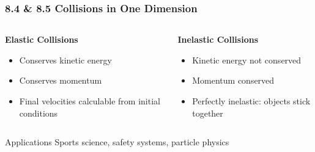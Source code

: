 \documentclass[aspectratio=169]{beamer}
\begin{document}
\begin{frame}
\frametitle{8.4 & 8.5 Collisions in One Dimension}
\begin{columns}[t]
\begin{column}{0.48\textwidth}
\textbf{Elastic Collisions}
\begin{itemize}
\item Conserves kinetic energy
\item Conserves momentum
\item Final velocities calculable from initial conditions
\end{itemize}
\end{column}

\begin{column}{0.48\textwidth}
\textbf{Inelastic Collisions}
\begin{itemize}
\item Kinetic energy not conserved
\item Momentum conserved
\item Perfectly inelastic: objects stick together
\end{itemize}
\end{column}
\end{columns}

\begin{block}{Applications}
Sports science, safety systems, particle physics
\end{block}
\end{frame}
\end{document}
